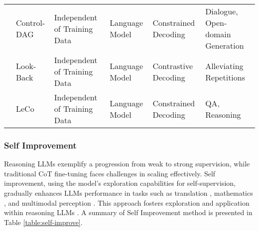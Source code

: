 \begin{table*}[t!]
{\begin{tabular}{llllll}
& \cellcolor[rgb]{ .949,  .949,  .949}Control-DAG\cite{chen2024controldagconstraineddecodingnonautoregressive}              & \cellcolor[rgb]{ .949,  .949,  .949}Independent of Training Data & \cellcolor[rgb]{ .949,  .949,  .949}Language Model                    & \cellcolor[rgb]{ .949,  .949,  .949}Constrained Decoding                     & \cellcolor[rgb]{ .949,  .949,  .949}Dialogue, Open-domain Generation    \\ 

&  Look-Back \cite{xu2023lookbackdecodingopenendedtext}   &Independent of Training Data    &Language Model  &Contrastive Decoding    &Alleviating Repetitions \\


& \cellcolor[rgb]{ .949,  .949,  .949}LeCo \cite{DBLP:journals/corr/abs-2403-19094}              & \cellcolor[rgb]{ .949,  .949,  .949}Independent of Training Data & \cellcolor[rgb]{ .949,  .949,  .949}Language Model                    & \cellcolor[rgb]{ .949,  .949,  .949}Constrained Decoding                     & \cellcolor[rgb]{ .949,  .949,  .949}QA, Reasoning                       \\ 

\bottomrule[1.2pt]
\end{tabular}
}
\label{table:self-improve}
\end{table*}




\subsubsection{Self Improvement}\label{self-improve}

Reasoning LLMs exemplify a progression from weak to strong supervision, while traditional CoT fine-tuning faces challenges in scaling effectively. 
Self improvement, using the model's exploration capabilities for self-supervision, gradually enhances LLMs performance in tasks such as translation \cite{DBLP:journals/corr/abs-2308-08998}, mathematics \cite{DBLP:conf/nips/ZelikmanWMG22, singh2024humandatascalingselftraining}, and multimodal perception \cite{deng2024enhancinglargevisionlanguage}. 
This approach fosters exploration and application within reasoning LLMs \cite{anthony2017thinkingfastslowdeep, tong2024can, tong2024optimizing, guan2025rstarmathsmallllmsmaster}. 
A summary of Self Improvement method is presented in Table \ref{table:self-improve}.








